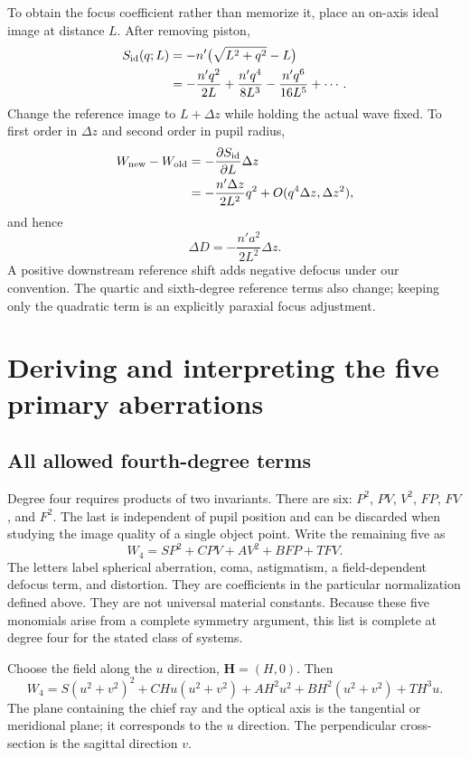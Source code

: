 To obtain the focus coefficient rather than memorize it, place an on-axis
ideal image at distance $L$. After removing piston,
\begin{align}
 S_{\rm id}(q;L)
 &=-n'\bigl(\sqrt{L^2+q^2}-L\bigr)\\
 &=-\frac{n'q^2}{2L}+\frac{n'q^4}{8L^3}
       -\frac{n'q^6}{16L^5}+\cdots.
\end{align}
Change the reference image to $L+\Delta z$ while holding the actual wave fixed.
To first order in $\Delta z$ and second order in pupil radius,
\begin{align}
 W_{\rm new}-W_{\rm old}
 &=-\frac{\partial S_{\rm id}}{\partial L}\Delta z\\
 &=-\frac{n'\Delta z}{2L^2}q^2+O(q^4\Delta z,\Delta z^2),
\end{align}
and hence
\begin{equation}
 \boxed{\Delta D=-\frac{n'a^2}{2L^2}\Delta z.}
 \label{ab:defocusshift}
\end{equation}
A positive downstream reference shift adds negative defocus under our
convention. The quartic and sixth-degree reference terms also change; keeping
only the quadratic term is an explicitly paraxial focus adjustment.

\chapter{Deriving and interpreting the five primary aberrations}
\label{ab:seidel}

\section{All allowed fourth-degree terms}
Degree four requires products of two invariants. There are six:
$P^2$, $PV$, $V^2$, $FP$, $FV$, and $F^2$. The last is independent of pupil
position and can be discarded when studying the image quality of a single
object point. Write the remaining five as
\begin{equation}
 \boxed{W_4=S P^2+C PV+A V^2+B FP+T FV.}
 \label{ab:W4}
\end{equation}
The letters label spherical aberration, coma, astigmatism, a field-dependent
defocus term, and distortion. They are coefficients in the particular
normalization defined above. They are not universal material constants.
Because these five monomials arise from a complete symmetry argument, this
list is complete at degree four for the stated class of systems.

Choose the field along the $u$ direction, $\bm H=(H,0)$. Then
\begin{equation}
 W_4=S(u^2+v^2)^2+CHu(u^2+v^2)
      +AH^2u^2+BH^2(u^2+v^2)+TH^3u.
 \label{ab:W4cart}
\end{equation}
The plane containing the chief ray and the optical axis is the tangential or
meridional plane; it corresponds to the $u$ direction. The perpendicular
cross-section is the sagittal direction $v$.

